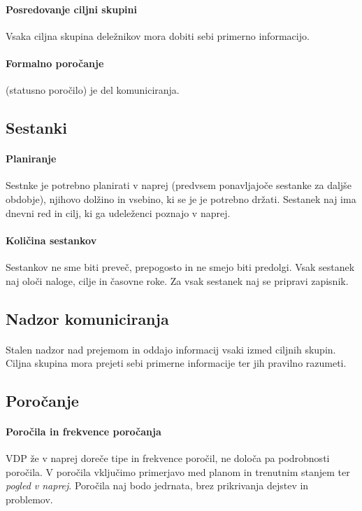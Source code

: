 \documentclass[a4paper,12pt]{report}
\begin{document}
         \paragraph{Posredovanje ciljni skupini} Vsaka ciljna skupina deležnikov mora dobiti sebi primerno informacijo.
         \paragraph{Formalno poročanje} (statusno poročilo) je del komuniciranja.
      \subsection{Sestanki}
         \paragraph{Planiranje} Sestnke je potrebno planirati v naprej (predvsem ponavljajoče sestanke za daljše obdobje), njihovo dolžino in vsebino, ki se je je potrebno držati. Sestanek naj ima dnevni red in cilj, ki ga udeleženci poznajo v naprej.
         \paragraph{Količina sestankov} Sestankov ne sme biti preveč, prepogosto in ne smejo biti predolgi. Vsak sestanek naj oloči naloge, cilje in časovne roke. Za vsak sestanek naj se pripravi zapisnik.
      \subsection{Nadzor komuniciranja}
         \paragraph{} Stalen nadzor nad prejemom in oddajo informacij vsaki izmed ciljnih skupin. Ciljna skupina mora prejeti sebi primerne informacije ter jih pravilno razumeti.
      \subsection{Poročanje}
         \paragraph{Poročila in frekvence poročanja} VDP že v naprej doreče tipe in frekvence poročil, ne določa pa podrobnosti poročila. V poročila vključimo primerjavo med planom in trenutnim stanjem ter \emph{pogled v naprej}. Poročila naj bodo jedrnata, brez prikrivanja dejstev in problemov.
\end{document}

